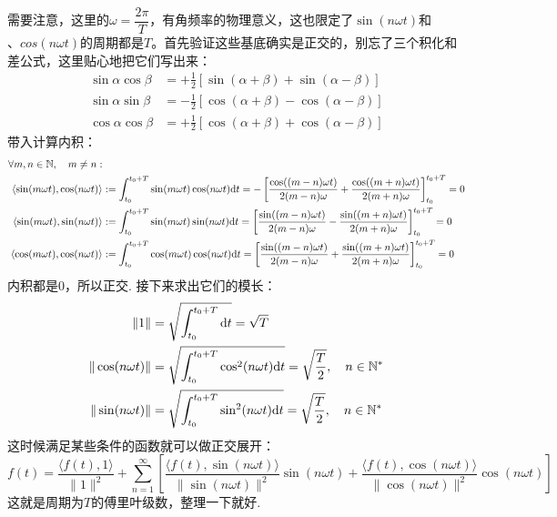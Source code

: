 需要注意，这里的\(\omega=\dfrac{2\pi}{T}\)，有角频率的物理意义，这也限定了\(\sin(n\omega t)\)和\(、cos(n\omega t)\)的周期都是\(T\)。首先验证这些基底确实是正交的，别忘了三个积化和差公式，这里贴心地把它们写出来：
\begin{align*}
    \sin\alpha\cos\beta &= +\frac{1}{2}\left[\sin(\alpha+\beta)+\sin(\alpha-\beta)\right] \\
    \sin\alpha\sin\beta &= -\frac{1}{2}\left[\cos(\alpha+\beta)-\cos(\alpha-\beta)\right] \\
    \cos\alpha\cos\beta &= +\frac{1}{2}\left[\cos(\alpha+\beta)+\cos(\alpha-\beta)\right]
\end{align*}
带入计算内积：
\begin{align*}
    \forall m,n\in \mathbb{N},\quad m \neq n: & \\
    \langle \sin(m\omega t), \cos(n\omega t) \rangle &:= \int_{t_0}^{t_0+T} \sin(m\omega t)\cos(n\omega t) {\rm d}t = -\left[\frac{\cos((m-n)\omega t)}{2(m-n)\omega}+\frac{\cos((m+n)\omega t)}{2(m+n)\omega}\right]_{t_0}^{t_0+T} = 0 \\
    \langle \sin(m\omega t), \sin(n\omega t) \rangle &:= \int_{t_0}^{t_0+T} \sin(m\omega t)\sin(n\omega t) {\rm d}t = \left[\frac{\sin((m-n)\omega t)}{2(m-n)\omega}-\frac{\sin((m+n)\omega t)}{2(m+n)\omega}\right]_{t_0}^{t_0+T} = 0 \\
    \langle \cos(m\omega t), \cos(n\omega t) \rangle &:= \int_{t_0}^{t_0+T} \cos(m\omega t)\cos(n\omega t) {\rm d}t = \left[\frac{\sin((m-n)\omega t)}{2(m-n)\omega}+\frac{\sin((m+n)\omega t)}{2(m+n)\omega}\right]_{t_0}^{t_0+T} = 0
\end{align*}
内积都是0，所以正交. 接下来求出它们的模长：
\begin{align*}
    \|1\| &= \sqrt{\int_{t_0}^{t_0+T}{\rm d}t} = \sqrt{T} \\
    \|\cos(n\omega t)\| &= \sqrt{\int_{t_0}^{t_0+T} \cos^2(n\omega t) {\rm d}t} = \sqrt{\frac{T}{2}},\quad n \in \mathbb{N}^* \\
    \|\sin(n\omega t)\| &= \sqrt{\int_{t_0}^{t_0+T} \sin^2(n\omega t) {\rm d}t} = \sqrt{\frac{T}{2}},\quad n \in \mathbb{N}^*
\end{align*}
这时候满足某些条件的函数就可以做正交展开：
\[f(t) = \frac{\langle f(t), 1 \rangle}{\|1\|^2} + \sum_{n=1}^{\infty} \left[\frac{\langle f(t), \sin(n\omega t) \rangle}{\|\sin(n\omega t)\|^2}\sin(n\omega t) + \frac{\langle f(t), \cos(n\omega t) \rangle}{\|\cos(n\omega t)\|^2}\cos(n\omega t)\right]\]
这就是周期为\(T\)的傅里叶级数，整理一下就好.

